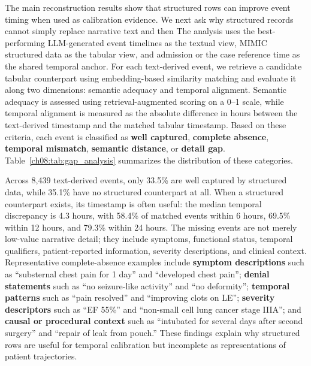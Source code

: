 The main reconstruction results show that structured rows can improve event timing when used as calibration evidence.
We next ask why structured records cannot simply replace narrative text and then
The analysis uses the best-performing LLM-generated event timelines as the textual view, MIMIC structured data as the tabular view, and admission or the case reference time as the shared temporal anchor.
For each text-derived event, we retrieve a candidate tabular counterpart using embedding-based similarity matching and evaluate it along two dimensions: semantic adequacy and temporal alignment.
Semantic adequacy is assessed using retrieval-augmented scoring on a 0--1 scale, while temporal alignment is measured as the absolute difference in hours between the text-derived timestamp and the matched tabular timestamp.
Based on these criteria, each event is classified as \textbf{well captured}, \textbf{complete absence}, \textbf{temporal mismatch}, \textbf{semantic distance}, or \textbf{detail gap}.
Table~\ref{ch08:tab:gap_analysis} summarizes the distribution of these categories.



















Across 8,439 text-derived events, only 33.5\% are well captured by structured data, while 35.1\% have no structured counterpart at all.
When a structured counterpart exists, its timestamp is often useful: the median temporal discrepancy is 4.3 hours, with 58.4\% of matched events within 6 hours, 69.5\% within 12 hours, and 79.3\% within 24 hours.
The missing events are not merely low-value narrative detail; they include symptoms, functional status, temporal qualifiers, patient-reported information, severity descriptions, and clinical context.
Representative complete-absence examples include \textbf{symptom descriptions} such as ``substernal chest pain for 1 day'' and ``developed chest pain''; \textbf{denial statements} such as ``no seizure-like activity'' and ``no deformity''; \textbf{temporal patterns} such as ``pain resolved'' and ``improving clots on LE''; \textbf{severity descriptors} such as ``EF 55\%'' and ``non-small cell lung cancer stage IIIA''; and \textbf{causal or procedural context} such as ``intubated for several days after second surgery'' and ``repair of leak from pouch.''
These findings explain why structured rows are useful for temporal calibration but incomplete as representations of patient trajectories.



